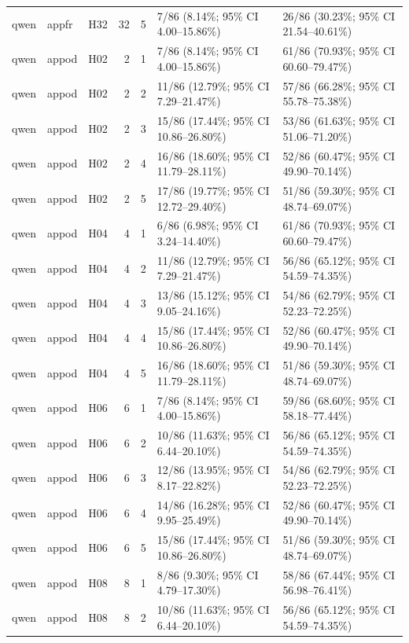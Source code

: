 \begin{longtable}{lllrrll}
qwen & appfr & H32 & 32 & 5 & 7/86 (8.14\%; 95\% CI 4.00–15.86\%) & 26/86 (30.23\%; 95\% CI 21.54–40.61\%) \\
qwen & appod & H02 & 2 & 1 & 7/86 (8.14\%; 95\% CI 4.00–15.86\%) & 61/86 (70.93\%; 95\% CI 60.60–79.47\%) \\
qwen & appod & H02 & 2 & 2 & 11/86 (12.79\%; 95\% CI 7.29–21.47\%) & 57/86 (66.28\%; 95\% CI 55.78–75.38\%) \\
qwen & appod & H02 & 2 & 3 & 15/86 (17.44\%; 95\% CI 10.86–26.80\%) & 53/86 (61.63\%; 95\% CI 51.06–71.20\%) \\
qwen & appod & H02 & 2 & 4 & 16/86 (18.60\%; 95\% CI 11.79–28.11\%) & 52/86 (60.47\%; 95\% CI 49.90–70.14\%) \\
qwen & appod & H02 & 2 & 5 & 17/86 (19.77\%; 95\% CI 12.72–29.40\%) & 51/86 (59.30\%; 95\% CI 48.74–69.07\%) \\
qwen & appod & H04 & 4 & 1 & 6/86 (6.98\%; 95\% CI 3.24–14.40\%) & 61/86 (70.93\%; 95\% CI 60.60–79.47\%) \\
qwen & appod & H04 & 4 & 2 & 11/86 (12.79\%; 95\% CI 7.29–21.47\%) & 56/86 (65.12\%; 95\% CI 54.59–74.35\%) \\
qwen & appod & H04 & 4 & 3 & 13/86 (15.12\%; 95\% CI 9.05–24.16\%) & 54/86 (62.79\%; 95\% CI 52.23–72.25\%) \\
qwen & appod & H04 & 4 & 4 & 15/86 (17.44\%; 95\% CI 10.86–26.80\%) & 52/86 (60.47\%; 95\% CI 49.90–70.14\%) \\
qwen & appod & H04 & 4 & 5 & 16/86 (18.60\%; 95\% CI 11.79–28.11\%) & 51/86 (59.30\%; 95\% CI 48.74–69.07\%) \\
qwen & appod & H06 & 6 & 1 & 7/86 (8.14\%; 95\% CI 4.00–15.86\%) & 59/86 (68.60\%; 95\% CI 58.18–77.44\%) \\
qwen & appod & H06 & 6 & 2 & 10/86 (11.63\%; 95\% CI 6.44–20.10\%) & 56/86 (65.12\%; 95\% CI 54.59–74.35\%) \\
qwen & appod & H06 & 6 & 3 & 12/86 (13.95\%; 95\% CI 8.17–22.82\%) & 54/86 (62.79\%; 95\% CI 52.23–72.25\%) \\
qwen & appod & H06 & 6 & 4 & 14/86 (16.28\%; 95\% CI 9.95–25.49\%) & 52/86 (60.47\%; 95\% CI 49.90–70.14\%) \\
qwen & appod & H06 & 6 & 5 & 15/86 (17.44\%; 95\% CI 10.86–26.80\%) & 51/86 (59.30\%; 95\% CI 48.74–69.07\%) \\
qwen & appod & H08 & 8 & 1 & 8/86 (9.30\%; 95\% CI 4.79–17.30\%) & 58/86 (67.44\%; 95\% CI 56.98–76.41\%) \\
qwen & appod & H08 & 8 & 2 & 10/86 (11.63\%; 95\% CI 6.44–20.10\%) & 56/86 (65.12\%; 95\% CI 54.59–74.35\%) \\

\end{longtable}
